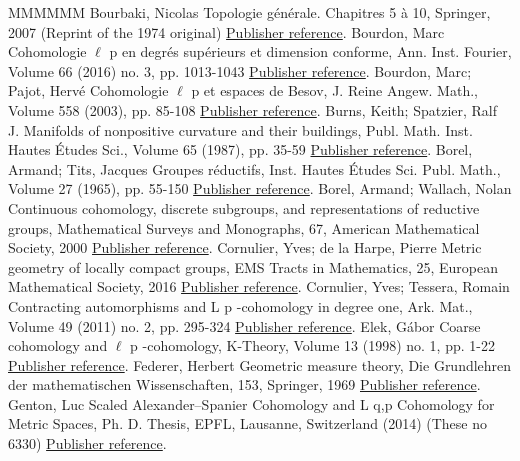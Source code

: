 \begin{thebibliography}{MMMMMM}
 Bourbaki, Nicolas Topologie générale. Chapitres 5 à 10, Springer, 2007 (Reprint of the 1974 original) \href{https://ahl.centre-mersenne.org/item/AHL_2020__3__1291_0/#BBK-TG-5to10}{Publisher reference}.
 Bourdon, Marc Cohomologie \(\ell\) p  en degrés supérieurs et dimension conforme, Ann. Inst. Fourier, Volume 66 (2016) no. 3, pp. 1013-1043 \href{https://ahl.centre-mersenne.org/item/AHL_2020__3__1291_0/#B16}{Publisher reference}.
 Bourdon, Marc; Pajot, Hervé Cohomologie \(\ell\) p  et espaces de Besov, J. Reine Angew. Math., Volume 558 (2003), pp. 85-108 \href{https://ahl.centre-mersenne.org/item/AHL_2020__3__1291_0/#BP2}{Publisher reference}.
 Burns, Keith; Spatzier, Ralf J. Manifolds of nonpositive curvature and their buildings, Publ. Math. Inst. Hautes Études Sci., Volume 65 (1987), pp. 35-59 \href{https://ahl.centre-mersenne.org/item/AHL_2020__3__1291_0/#BS}{Publisher reference}.
 Borel, Armand; Tits, Jacques Groupes réductifs, Inst. Hautes Études Sci. Publ. Math., Volume 27 (1965), pp. 55-150 \href{https://ahl.centre-mersenne.org/item/AHL_2020__3__1291_0/#BoTi}{Publisher reference}.
 Borel, Armand; Wallach, Nolan Continuous cohomology, discrete subgroups, and representations of reductive groups, Mathematical Surveys and Monographs, 67, American Mathematical Society, 2000 \href{https://ahl.centre-mersenne.org/item/AHL_2020__3__1291_0/#BW}{Publisher reference}.
 Cornulier, Yves; de la Harpe, Pierre Metric geometry of locally compact groups, EMS Tracts in Mathematics, 25, European Mathematical Society, 2016 \href{https://ahl.centre-mersenne.org/item/AHL_2020__3__1291_0/#CdH}{Publisher reference}.
 Cornulier, Yves; Tessera, Romain Contracting automorphisms and L p -cohomology in degree one, Ark. Mat., Volume 49 (2011) no. 2, pp. 295-324 \href{https://ahl.centre-mersenne.org/item/AHL_2020__3__1291_0/#CT}{Publisher reference}.
 Elek, Gábor Coarse cohomology and \(\ell\) p -cohomology, K-Theory, Volume 13 (1998) no. 1, pp. 1-22 \href{https://ahl.centre-mersenne.org/item/AHL_2020__3__1291_0/#Elek}{Publisher reference}.
 Federer, Herbert Geometric measure theory, Die Grundlehren der mathematischen Wissenschaften, 153, Springer, 1969 \href{https://ahl.centre-mersenne.org/item/AHL_2020__3__1291_0/#Fed}{Publisher reference}.
 Genton, Luc Scaled Alexander–Spanier Cohomology and L q,p  Cohomology for Metric Spaces, Ph. D. Thesis, EPFL, Lausanne, Switzerland (2014) (These no 6330) \href{https://ahl.centre-mersenne.org/item/AHL_2020__3__1291_0/#Genton}{Publisher reference}.

\end{thebibliography}
